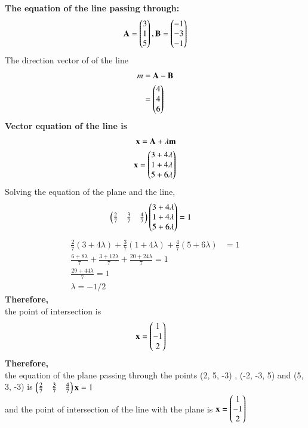 \documentclass[journal]{IEEEtran}
\begin{document}
\textbf{The equation of the line passing through:}\\
\begin{align}
\mathbf{A}=\begin{pmatrix}3\\1\\5\end{pmatrix},\mathbf{B}=\begin{pmatrix}-1\\-3\\-1\end{pmatrix}\\
\end{align}
The direction vector of of the line
\begin{align}
m&=\mathbf{A}-\mathbf{B}\\
&=\begin{pmatrix}4\\4\\6\end{pmatrix}
\end{align}
\textbf{Vector equation of the line is}
\begin{align}
\mathbf{x}=\mathbf{A}+\lambda\mathbf{m}\\\nonumber
\mathbf{x}=\begin{pmatrix}3+4\lambda\\1+4\lambda\\5+6\lambda\end{pmatrix}
\end{align}
Solving the equation of the plane and the line,\\
\begin{align}
\begin{pmatrix}\tfrac{2}{7}&\tfrac{3}{7} &\tfrac{4}{7}\end{pmatrix}\begin{pmatrix}3+4\lambda\\1+4\lambda\\5+6\lambda\end{pmatrix}&=1
\end{align}
\begin{align}
\tfrac{2}{7}(3+4\lambda) +\tfrac{3}{7}(1+4\lambda)+ \tfrac{4}{7}(5+6\lambda)&=1\\
\frac{6 + 8\lambda}{7} + \frac{3 + 12\lambda}{7} + \frac{20 + 24\lambda}{7} = 1\\
\frac{29 + 44\lambda}{7} = 1\\
\lambda=-1/2
\end{align}
\textbf{Therefore,}\\
the point of intersection is
\begin{align}
\mathbf{x}&=\begin{pmatrix}1\\-1\\2\end{pmatrix}
\end{align}
\textbf{Therefore,}\\
the equation of the plane passing through the points (2, 5, -3) , (-2, -3, 5) and
(5, 3, -3) is $\begin{pmatrix}\tfrac{2}{7}&\tfrac{3}{7} &\tfrac{4}{7}\end{pmatrix}\mathbf{x}=1$\\
and the point of intersection of the line with the plane is $\mathbf{x}=\begin{pmatrix}1\\-1\\2\end{pmatrix}$
\end{document}
